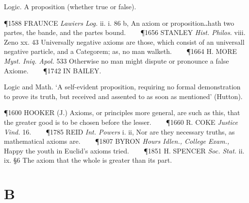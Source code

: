 \begin{description}[wide, labelwidth=!, labelindent=0pt]
\begin{myenumerate}
 Logic. A proposition (whether true or false).

\P 1588 FRAUNCE  \textit{Lawiers Log.} ii. i. 86 b, An axiom or proposition‥hath two partes, the bande, and the partes bound.    
\P 1656 STANLEY  \textit{Hist. Philos.} viii. Zeno xx. 43 Universally negative axioms are those, which consist of an universall negative particle, and a Categorem; as, no man walketh.    
\P 1664 H. MORE  \textit{Myst. Iniq. Apol.} 533 Otherwise no man might dispute or pronounce a false Axiome.    
\P 1742 IN BAILEY.

 Logic and Math. ‘A self-evident proposition, requiring no formal demonstration to prove its truth, but received and assented to as soon as mentioned’ (Hutton).

\P 1600 HOOKER (J.) Axioms, or principles more general, are such as this, that the greater good is to be chosen before the lesser.    
\P 1660 R. COKE  \textit{Justice Vind.} 16.    
\P 1785 REID  \textit{Int. Powers} i. ii, Nor are they necessary truths, as mathematical axioms are.    
\P 1807 BYRON  \textit{Hours Idlen., College Exam.,} Happy the youth in Euclid's axioms tried.    
\P 1851 H. SPENCER  \textit{Soc. Stat.} ii. ix. §6 The axiom that the whole is greater than its part.
\end{myenumerate}

\end{description}




\chapter*{B}
%

